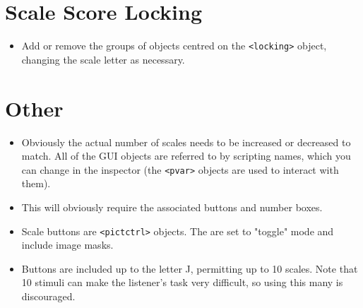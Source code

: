 \documentclass[10pt]{article}
\begin{document}
\section{Scale Score Locking}
\begin{itemize}
\item Add or remove the groups of objects centred on the \verb|<locking>| object, changing the scale letter as necessary.
\end{itemize}

\section{Other}
\begin{itemize}
\item  Obviously the actual number of scales needs to be increased or decreased to match. All of the GUI objects are referred to by scripting names, which you can change in the inspector (the \verb|<pvar>| objects are used to interact with them).
\item  This will obviously require the associated buttons and number boxes.
\item Scale buttons are \verb|<pictctrl>| objects. The are set to "toggle" mode and include image masks.
\item Buttons are included up to the letter J, permitting up to 10 scales. Note that 10 stimuli can make the listener's task very difficult, so using this many is discouraged.
\end{itemize}
\end{document}
